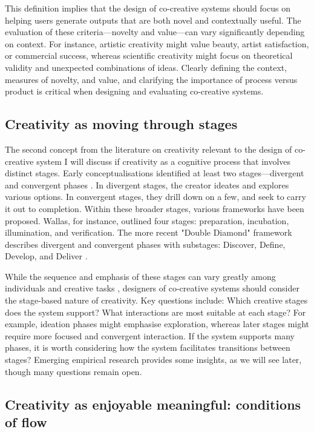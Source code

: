 This definition implies that the design of co-creative systems should focus on helping users generate outputs that are both novel and contextually useful. The evaluation of these criteria—novelty and value—can vary significantly depending on context. For instance, artistic creativity might value beauty, artist satisfaction, or commercial success, whereas scientific creativity might focus on theoretical validity and unexpected combinations of ideas. Clearly defining the context, measures of novelty, and value, and clarifying the importance of process versus product is critical when designing and evaluating co-creative systems.

\subsection{Creativity as moving through stages}

The second concept from the literature on creativity relevant to the design of co-creative system I will discuss if creativity as a cognitive process that involves distinct stages. Early conceptualisations identified at least two stages—divergent and convergent phases \cite{Wallas1926-ky, Guilford1950-hs, Lubart2001-vl, Kaufman2009-vx}. In divergent stages, the creator ideates and explores various options. In convergent stages, they drill down on a few, and seek to carry it out to completion. Within these broader stages, various frameworks have been proposed. Wallas, for instance, outlined four stages: preparation, incubation, illumination, and verification. The more recent "Double Diamond" framework describes divergent and convergent phases with substages: Discover, Define, Develop, and Deliver \cite{Design-Council2004-fv}.

While the sequence and emphasis of these stages can vary greatly among individuals and creative tasks \cite{Paul2023-cq}, designers of co-creative systems should consider the stage-based nature of creativity. Key questions include: Which creative stages does the system support? What interactions are most suitable at each stage? For example, ideation phases might emphasise exploration, whereas later stages might require more focused and convergent interaction. If the system supports many phases, it is worth considering how the system facilitates transitions between stages? Emerging empirical research provides some insights, as we will see later, though many questions remain open.

\subsection{Creativity as enjoyable meaningful: conditions of flow}

